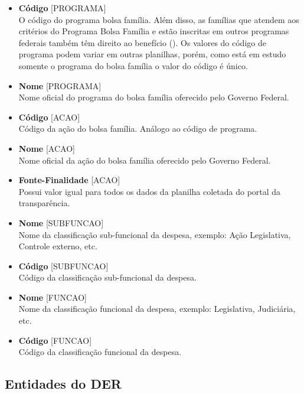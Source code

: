 \documentclass[12pt]{article}
\begin{document}
\begin{itemize}
		\item \textbf{Código} [PROGRAMA] \\  O código do programa bolsa família. Além disso, as famílias que atendem aos critérios do Programa Bolsa Família e estão inscritas em outros programas federais também têm direito ao benefício (\cite{caixa}). Os valores do código de programa podem variar em outras planilhas, porém, como está em estudo somente o programa do bolsa família o valor do código é único.
		\item \textbf{Nome} [PROGRAMA] \\ Nome oficial do programa do bolsa família oferecido pelo Governo Federal.
		\item \textbf{Código} [ACAO] \\ Código da ação do bolsa família. Análogo ao código de programa. 
		\item \textbf{Nome} [ACAO] \\ Nome oficial da ação do bolsa família oferecido pelo Governo Federal.
		\item \textbf{Fonte-Finalidade} [ACAO] \\ Possui valor igual para todos os dados da planilha coletada do portal da transparência.
		\item \textbf{Nome} [SUBFUNCAO] \\ Nome da classificação sub-funcional da despesa, exemplo: Ação Legislativa, Controle externo, etc.
		\item \textbf{Código} [SUBFUNCAO] \\ Código da classificação sub-funcional da despesa.
		\item \textbf{Nome} [FUNCAO] \\ Nome da classificação funcional da despesa, exemplo: Legislativa, Judiciária, etc.
		\item \textbf{Código} [FUNCAO] \\ Código da classificação funcional da despesa.
	\end{itemize}
	
	\subsection{Entidades do DER}
	\label{sec:ent}
	
\end{document}
